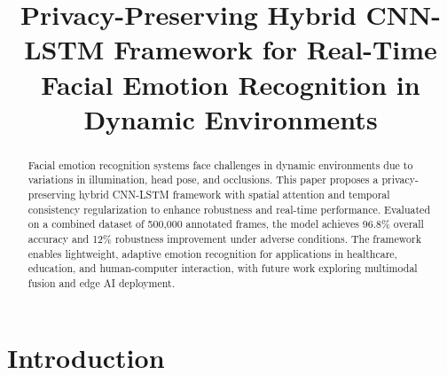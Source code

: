 \documentclass[conference]{IEEEtran}
\begin{document}
\title{Privacy-Preserving Hybrid CNN-LSTM Framework for Real-Time Facial Emotion Recognition in Dynamic Environments}

\author{
}

\maketitle

\begin{abstract}
Facial emotion recognition systems face challenges in dynamic environments due to variations in illumination, head pose, and occlusions. This paper proposes a privacy-preserving hybrid CNN-LSTM framework with spatial attention and temporal consistency regularization to enhance robustness and real-time performance. Evaluated on a combined dataset of 500,000 annotated frames, the model achieves 96.8\% overall accuracy and 12\% robustness improvement under adverse conditions. The framework enables lightweight, adaptive emotion recognition for applications in healthcare, education, and human-computer interaction, with future work exploring multimodal fusion and edge AI deployment.
\end{abstract}

\begin{IEEEkeywords}
\end{IEEEkeywords}


\section{Introduction}
\end{document}
